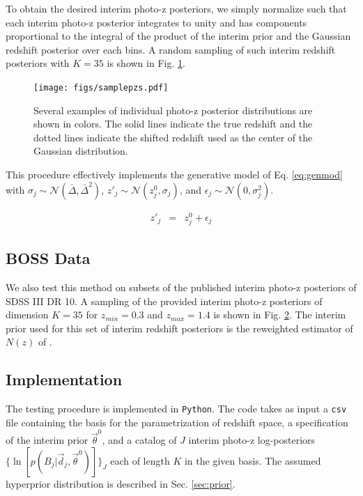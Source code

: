 \documentclass[preprint]{aastex}
\begin{document}
To obtain the desired interim photo-z posteriors, we simply normalize such that 
each interim photo-z posterior integrates to unity and has components 
proportional to the integral of the product of the interim prior and the 
Gaussian redshift posterior over each bins.  A random sampling of such interim 
redshift posteriors with $K=35$ is shown in Fig. \ref{fig:nullpzs}.

\begin{figure}
\texttt{[image: figs/samplepzs.pdf]}
\caption{Several examples of individual photo-z posterior distributions are 
shown in colors.  The solid lines indicate the true redshift and the dotted 
lines indicate the shifted redshift used as the center of the Gaussian 
distribution.}
\label{fig:nullpzs}
\end{figure}

This procedure effectively implements the generative model of Eq. 
\ref{eq:genmod} with 
$\sigma_{j}\sim\mathcal{N}(\bar{\Delta},\bar{\Delta}^{2})$, 
$z'_{j}\sim\mathcal{N}(z^{0}_{j},\sigma_{j})$, and 
$\epsilon_{j}\sim\mathcal{N}(0,\sigma^{2}_{j})$.

\begin{eqnarray}
\label{eq:genmod}
z'_{j} &=& z^{0}_{j}+\epsilon_{j}
\end{eqnarray}

\subsection{BOSS Data}
\label{sec:data}

We also test this method on subsets of the published interim photo-z posteriors 
of SDSS III DR 10.  A sampling of the provided interim photo-z posteriors of 
dimension $K=35$ for $z_{min}=0.3$ and $z_{max}=1.4$ is shown in Fig. 
\ref{fig:datapzs}.  The interim prior used for this set of interim redshift 
posteriors is the reweighted estimator of $N(z)$ of \citet{Sheldon2012}.

\begin{figure}
\caption{}
\label{fig:datapzs}
\end{figure}

\clearpage
\subsection{Implementation}
\label{sec:mcmc}

The testing procedure is implemented in \texttt{Python}.  The code takes as 
input a \texttt{csv} file containing the basis for the parametrization of 
redshift space, a specification of the interim prior $\vec{\theta}^{0}$, and a 
catalog of $J$ interim photo-z log-posteriors 
$\{\ln[p(B_{j}|\vec{d}_{j},\vec{\theta}^{0})]\}_{J}$ each of length $K$ in the 
given basis.  The assumed hyperprior distribution is described in Sec. 
\ref{sec:prior}.
\end{document}
